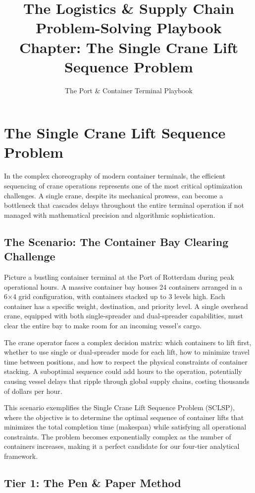 \documentclass{article}
\title{The Logistics \& Supply Chain Problem-Solving Playbook\\
Chapter: The Single Crane Lift Sequence Problem}
\author{The Port \& Container Terminal Playbook}
\date{}
\begin{document}
\maketitle

\section{The Single Crane Lift Sequence Problem}

In the complex choreography of modern container terminals, the efficient sequencing of crane operations represents one of the most critical optimization challenges. A single crane, despite its mechanical prowess, can become a bottleneck that cascades delays throughout the entire terminal operation if not managed with mathematical precision and algorithmic sophistication.

\subsection{The Scenario: The Container Bay Clearing Challenge}

Picture a bustling container terminal at the Port of Rotterdam during peak operational hours. A massive container bay houses 24 containers arranged in a 6×4 grid configuration, with containers stacked up to 3 levels high. Each container has a specific weight, destination, and priority level. A single overhead crane, equipped with both single-spreader and dual-spreader capabilities, must clear the entire bay to make room for an incoming vessel's cargo.

The crane operator faces a complex decision matrix: which containers to lift first, whether to use single or dual-spreader mode for each lift, how to minimize travel time between positions, and how to respect the physical constraints of container stacking. A suboptimal sequence could add hours to the operation, potentially causing vessel delays that ripple through global supply chains, costing thousands of dollars per hour.

This scenario exemplifies the Single Crane Lift Sequence Problem (SCLSP), where the objective is to determine the optimal sequence of container lifts that minimizes the total completion time (makespan) while satisfying all operational constraints. The problem becomes exponentially complex as the number of containers increases, making it a perfect candidate for our four-tier analytical framework.

\subsection{Tier 1: The Pen \& Paper Method}
\end{document}
